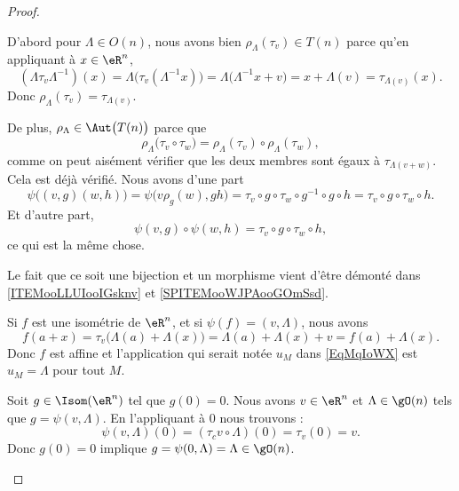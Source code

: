 \begin{proof}
\begin{subproof}
\begin{subproof}
			D'abord pour \( \Lambda\in O(n)\), nous avons bien \( \rho_{\Lambda}(\tau_v)\in T(n)\) parce qu'en appliquant à \( x\in \eR^n\),
			\begin{equation}
				(\Lambda\tau_v\Lambda^{-1})(x)=\Lambda\big( \tau_v(\Lambda^{-1} x) \big)=\Lambda\big( \Lambda^{-1}x+v \big)=x+\Lambda(v)=\tau_{\Lambda(v)}(x).
			\end{equation}
			Donc \( \rho_{\Lambda}(\tau_v)=\tau_{\Lambda(v)}\).

			De plus, \( \rho_{\Lambda}\in\Aut\big( T(n) \big)\) parce que
			\begin{equation}
				\rho_{\Lambda}\big( \tau_v\circ \tau_w \big)=\rho_{\Lambda}(\tau_v)\circ\rho_{\Lambda}(\tau_w),
			\end{equation}
			comme on peut aisément vérifier que les deux membres sont égaux à \( \tau_{\Lambda(v+w)}\).
			Cela est déjà vérifié.
					\label{SPITEMooWJPAooGOmSsd}
			Nous avons d'une part
			\begin{equation}
				\psi\big( (v,g)(w,h) \big)=\psi\big( v\rho_g(w),gh \big)=\tau_v\circ g\circ\tau_w\circ g^{-1}\circ g\circ h=\tau_v\circ g\circ\tau_w\circ h.
			\end{equation}
			Et d'autre part,
			\begin{equation}
				\psi(v,g)\circ\psi(w,h)=\tau_v\circ g\circ \tau_w\circ h,
			\end{equation}
			ce qui est la même chose.
		\end{subproof}

		Le fait que ce soit une bijection et un morphisme vient d'être démonté dans \ref{ITEMooLLUIooIGsknv} et \ref{SPITEMooWJPAooGOmSsd}.

		Si \(f \) est une isométrie de \( \eR^n\), et si \( \psi(f)=(v,\Lambda)\), nous avons
		\begin{equation}
			f(a+x)=\tau_v\big( \Lambda(a)+\Lambda(x) \big)=\Lambda(a)+\Lambda(x)+v=f(a)+\Lambda(x).
		\end{equation}
		Donc \( f\) est affine et l'application qui serait notée \( u_M\) dans \eqref{EqMqIoWX} est \( u_M=\Lambda\) pour tout \( M\).

		Soit \( g\in\Isom(\eR^n)\) tel que \( g(0)=0\). Nous avons \( v\in \eR^n\) et \( \Lambda\in\gO(n)\) tels que \( g=\psi(v,\Lambda)\). En l'appliquant à \( 0\) nous trouvons :
		\begin{equation}
			\psi(v,\Lambda)(0)=(\tau_cv\circ\Lambda)(0)=\tau_v(0)=v.
		\end{equation}
		Donc \( g(0)=0\) implique \( g=\psi(0,\Lambda)=\Lambda\in\gO(n)\).



\end{subproof}
\end{proof}
